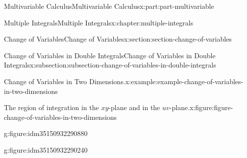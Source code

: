\documentclass[twoside,10pt,]{tufte-book}
\numberwithin{equation}{part}
\begin{document}
\begin{partptx}{Multivariable Calculus}{}{Multivariable Calculus}{}{}{x:part:part-multivariable}
\begin{chapterptx}{Multiple Integrals}{}{Multiple Integrals}{}{}{x:chapter:multiple-integrals}
\begin{sectionptx}{Change of Variables}{}{Change of Variables}{}{}{x:section:section-change-of-variables}
\begin{subsectionptx}{Change of Variables in Double Integrals}{}{Change of Variables in Double Integrals}{}{}{x:subsection:subsection-change-of-variables-in-double-integrals}
\begin{example}{Change of Variables in Two Dimensions.}{x:example:example-change-of-variables-in-two-dimensions}
\begin{figureptx}{The region of integration in the \(xy\)-plane and in the \(uv\)-plane.}{x:figure:figure-change-of-variables-in-two-dimensions}{}
\begin{sidebyside}{2}{0}{0}{0}
\begin{sbspanel}{0.5}
\begin{subfigureptx}{}{g:figure:idm35150932290880}{}
{
}%
\tcblower
\end{subfigureptx}%
\end{sbspanel}%
\begin{sbspanel}{0.5}%
\begin{subfigureptx}{}{g:figure:idm35150932290240}{}%
\end{subfigureptx}
\end{sbspanel}
\end{sidebyside}
\end{figureptx}
\end{example}
\end{subsectionptx}
\end{sectionptx}
\end{chapterptx}
\end{partptx}
\end{document}
